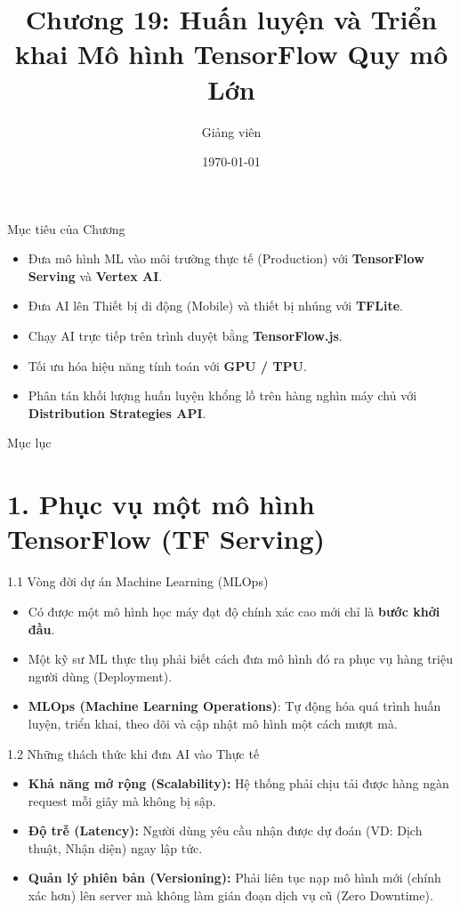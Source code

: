 \documentclass[aspectratio=169, 12pt]{beamer}
\title[ML - Chap 19]{Chương 19: Huấn luyện và Triển khai Mô hình TensorFlow Quy mô Lớn}
\author[Giảng viên]{Giảng viên}
\institute[Đại học Đông Á]{Đại học Đông Á}
\date{\today}
\begin{document}
\begin{frame}
    \titlepage
\end{frame}

\begin{frame}{Mục tiêu của Chương}
    \begin{itemize}
        \item Đưa mô hình ML vào môi trường thực tế (Production) với \textbf{TensorFlow Serving} và \textbf{Vertex AI}.
        \item Đưa AI lên Thiết bị di động (Mobile) và thiết bị nhúng với \textbf{TFLite}.
        \item Chạy AI trực tiếp trên trình duyệt bằng \textbf{TensorFlow.js}.
        \item Tối ưu hóa hiệu năng tính toán với \textbf{GPU / TPU}.
        \item Phân tán khối lượng huấn luyện khổng lồ trên hàng nghìn máy chủ với \textbf{Distribution Strategies API}.
    \end{itemize}
\end{frame}

\begin{frame}{Mục lục}
    \tableofcontents
\end{frame}

\section{1. Phục vụ một mô hình TensorFlow (TF Serving)}

\begin{frame}{1.1 Vòng đời dự án Machine Learning (MLOps)}
    \begin{itemize}
        \item Có được một mô hình học máy đạt độ chính xác cao mới chỉ là \textbf{bước khởi đầu}.
        \item Một kỹ sư ML thực thụ phải biết cách đưa mô hình đó ra phục vụ hàng triệu người dùng (Deployment).
        \item \textbf{MLOps (Machine Learning Operations)}: Tự động hóa quá trình huấn luyện, triển khai, theo dõi và cập nhật mô hình một cách mượt mà.
    \end{itemize}
\end{frame}

\begin{frame}{1.2 Những thách thức khi đưa AI vào Thực tế}
    \begin{itemize}
        \item \textbf{Khả năng mở rộng (Scalability):} Hệ thống phải chịu tải được hàng ngàn request mỗi giây mà không bị sập.
        \item \textbf{Độ trễ (Latency):} Người dùng yêu cầu nhận được dự đoán (VD: Dịch thuật, Nhận diện) ngay lập tức.
        \item \textbf{Quản lý phiên bản (Versioning):} Phải liên tục nạp mô hình mới (chính xác hơn) lên server mà không làm gián đoạn dịch vụ cũ (Zero Downtime).
    \end{itemize}
\end{frame}
\end{document}

